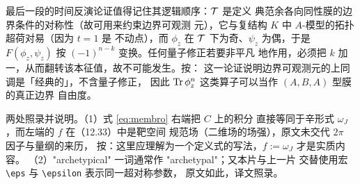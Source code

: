 \begin{yizhu}[物理图像]
最后一段的时间反演论证值得记住其逻辑顺序：${{\mathcal{T}}}$ 是定义
典范余各向同性膜的边界条件的对称性（故可用来约束边界可观测
元），它与复结构 $K$ 中 $A$-模型的拓扑超荷对易（因为 $t=1$ 是
不动点），而 $\phi_z$ 在 ${{\mathcal{T}}}$ 下为奇、$\psi_z$ 为偶，于是
$F(\phi_z,\psi_z)$ 按 $(-1)^{n-k}$ 变换。任何量子修正若要非平凡
地作用，必须把 $k$ 加一，从而翻转该本征值，故不可能发生。按：
这一论证说明边界可观测元的上同调是「经典的」，不含量子修正，
因此 $\operatorname{Tr}\phi_z^n$ 这类算子可以当作 $(A,B,A)$ 型膜的真正边界
自由度。
\end{yizhu}

\begin{yizhu}[原文疑误]
两处照录并说明。（1）式 \eqref{eq:membro} 右端把 $C$ 上的积分
直接等同于辛形式 $\omega_J$，而左端的 $f$ 在（12.33）中是靶空间
规范场（二维场的场强），原文未交代 $2\pi$ 因子与量纲的来历，
按：这里应理解为一个定义式的写法，$f:=\omega_J$ 才是实质内容。
（2）"archetypical" 一词通常作 "archetypal"；又本片与上一片
交替使用宏 \verb|\eps| 与 \verb|\epsilon| 表示同一超对称参数，
原文如此，译文照录。
\end{yizhu}
